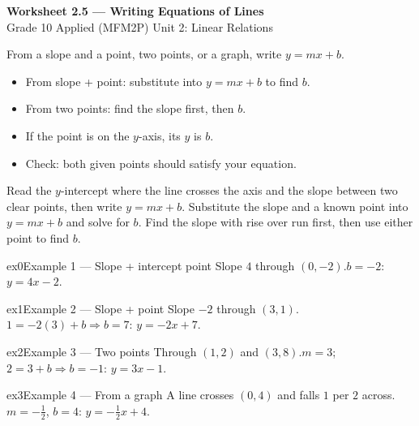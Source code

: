 \documentclass[11pt]{article}
\begin{document}
\begin{center}
{\LARGE\bfseries\color{titleblue}Worksheet 2.5 --- Writing Equations of Lines}\\[2pt]
{\small Grade 10 Applied (MFM2P) \textperiodcentered{} Unit 2: Linear Relations}
\end{center}

\begin{ideabox}
From a slope and a point, two points, or a graph, write $y=mx+b$.
\begin{itemize}[leftmargin=*,itemsep=2pt]
  \item From slope + point: substitute into $y=mx+b$ to find $b$.
  \item From two points: find the slope first, then $b$.
  \item If the point is on the $y$-axis, its $y$ is $b$.
  \item Check: both given points should satisfy your equation.
\end{itemize}
\end{ideabox}

\begin{learnbox}
Read the $y$-intercept where the line crosses the axis and the slope between two clear points, then write $y=mx+b$.
Substitute the slope and a known point into $y=mx+b$ and solve for $b$.
Find the slope with rise over run first, then use either point to find $b$.
\end{learnbox}


\begin{example}{ex0}{Example 1 --- Slope + intercept point}
Slope $4$ through $(0,-2)$.\soln $b=-2$: $y=4x-2$.
\end{example}

\begin{example}{ex1}{Example 2 --- Slope + point}
Slope $-2$ through $(3,1)$.\soln $1=-2(3)+b\Rightarrow b=7$: $y=-2x+7$.
\end{example}

\begin{example}{ex2}{Example 3 --- Two points}
Through $(1,2)$ and $(3,8)$.\soln $m=3$; $2=3+b\Rightarrow b=-1$: $y=3x-1$.
\end{example}

\begin{example}{ex3}{Example 4 --- From a graph}
A line crosses $(0,4)$ and falls $1$ per $2$ across.\soln $m=-\tfrac12$, $b=4$: $y=-\tfrac12x+4$.
\end{example}
\end{document}
